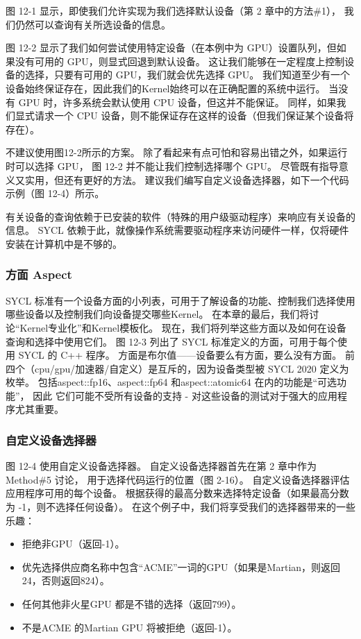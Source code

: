 图 12-1 显示，即使我们允许实现为我们选择默认设备（第 2 章中的方法\#1），
我们仍然可以查询有关所选设备的信息。

图 12-2 显示了我们如何尝试使用特定设备（在本例中为 GPU）设置队列，但如果没有可用的 GPU，则显式回退到默认设备。 
这让我们能够在一定程度上控制设备的选择，只要有可用的 GPU，我们就会优先选择 GPU。 
我们知道至少有一个设备始终保证存在，因此我们的Kernel始终可以在正确配置的系统中运行。 
当没有 GPU 时，许多系统会默认使用 CPU 设备，但这并不能保证。 
同样，如果我们显式请求一个 CPU 设备，则不能保证存在这样的设备（但我们保证某个设备将存在）。

不建议使用图12-2所示的方案。 除了看起来有点可怕和容易出错之外，如果运行时可以选择 GPU，
图 12-2 并不能让我们控制选择哪个 GPU。 尽管既有指导意义又实用，但还有更好的方法。 
建议我们编写自定义设备选择器，如下一个代码示例（图 12-4）所示。

有关设备的查询依赖于已安装的软件（特殊的用户级驱动程序）来响应有关设备的信息。 
SYCL 依赖于此，就像操作系统需要驱动程序来访问硬件一样，仅将硬件安装在计算机中是不够的。

\subsubsection{方面 Aspect}
SYCL 标准有一个设备方面的小列表，可用于了解设备的功能、控制我们选择使用哪些设备以及控制我们向设备提交哪些Kernel。 
在本章的最后，我们将讨论“Kernel专业化”和Kernel模板化。 现在，我们将列举这些方面以及如何在设备查询和选择中使用它们。 
图 12-3 列出了 SYCL 标准定义的方面，可用于每个使用 SYCL 的 C++ 程序。 
方面是布尔值——设备要么有方面，要么没有方面。 
前四个（cpu/gpu/加速器/自定义）是互斥的，因为设备类型被 SYCL 2020 定义为枚举。
包括aspect::fp16、aspect::fp64 和aspect::atomic64 在内的功能是“可选功能”，
因此 它们可能不受所有设备的支持 - 对这些设备的测试对于强大的应用程序尤其重要。

\subsubsection{自定义设备选择器}
图 12-4 使用自定义设备选择器。 自定义设备选择器首先在第 2 章中作为 Method\#5 讨论，
用于选择代码运行的位置（图 2-16）。 自定义设备选择器评估应用程序可用的每个设备。 
根据获得的最高分数来选择特定设备（如果最高分数为 -1，则不选择任何设备）。 
在这个例子中，我们将享受我们的选择器带来的一些乐趣：

\begin{itemize}
	\item 拒绝非GPU（返回-1）。

	\item 优先选择供应商名称中包含“ACME”一词的GPU（如果是Martian，则返回24，否则返回824）。

	\item 任何其他非火星GPU 都是不错的选择（返回799）。

	\item 不是ACME 的Martian GPU 将被拒绝（返回-1）。
\end{itemize}

